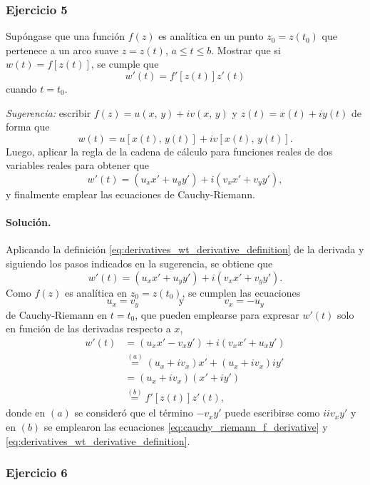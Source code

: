 \documentclass[a4paper]{report}
\begin{document}
\subsubsection{Ejercicio 5}

Supóngase que una función \(f(z)\) es analítica en un punto \(z_0=z(t_0)\) que pertenece a un arco suave \(z=z(t)\), \(a\leq t\leq b\). Mostrar que si \(w(t)=f[z(t)]\), se cumple que 
\[
 w'(t)=f'[z(t)]z'(t)
\]
cuando \(t=t_0\).

\emph{Sugerencia:} escribir \(f(z)=u(x,\,y)+iv(x,\,y)\) y \(z(t)=x(t)+iy(t)\) de forma que 
\[
 w(t)=u[x(t),\,y(t)]+iv[x(t),\,y(t)].
\]
Luego, aplicar la regla de la cadena de cálculo para funciones reales de dos variables reales para obtener que 
\[
 w'(t)=(u_xx'+u_yy')+i(v_xx'+v_yy'),
\]
y finalmente emplear las ecuaciones de Cauchy-Riemann.

\paragraph{Solución.} Aplicando la definición \ref{eq:derivatives_wt_derivative_definition} de la derivada y siguiendo los pasos indicados en la sugerencia, se obtiene que 
\[
 w'(t)=(u_xx'+u_yy')+i(v_xx'+v_yy').
\]
Como \(f(z)\) es analítica en \(z_0=z(t_0)\), se cumplen las ecuaciones 
\[
 u_x=v_y
 \qquad\qquad\textrm{y}\qquad\qquad
 v_x=-u_y
\]
de Cauchy-Riemann en \(t=t_0\), que pueden emplearse para expresar \(w'(t)\) solo en función de las derivadas respecto a \(x\),
\begin{align*}
 w'(t)&=(u_xx'-v_xy')+i(v_xx'+u_xy')\\
  &\overset{(a)}{=}(u_x+iv_x)x'+(u_x+iv_x)iy'\\
  &=(u_x+iv_x)(x'+iy')\\
  &\overset{(b)}{=}f'[z(t)]z'(t),
\end{align*}
donde en \((a)\) se consideró que el término \(-v_xy'\) puede escribirse como \(iiv_xy'\) y en \((b)\) se emplearon las ecuaciones \ref{eq:cauchy_riemann_f_derivative} y \ref{eq:derivatives_wt_derivative_definition}.

\subsubsection{Ejercicio 6}
\end{document}
